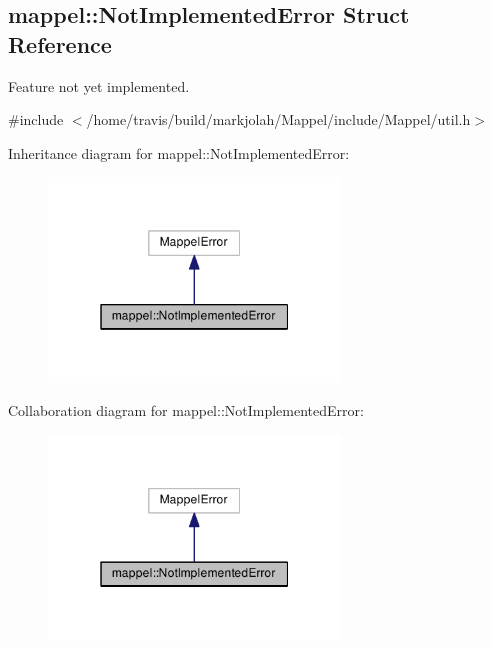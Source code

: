 \hypertarget{structmappel_1_1NotImplementedError}{}\subsection{mappel\+:\+:Not\+Implemented\+Error Struct Reference}
\label{structmappel_1_1NotImplementedError}


Feature not yet implemented.  




{\ttfamily \#include $<$/home/travis/build/markjolah/\+Mappel/include/\+Mappel/util.\+h$>$}



Inheritance diagram for mappel\+:\+:Not\+Implemented\+Error\+:\nopagebreak
\begin{figure}[H]
\begin{center}
\leavevmode
\includegraphics[width=220pt]{structmappel_1_1NotImplementedError__inherit__graph}
\end{center}
\end{figure}


Collaboration diagram for mappel\+:\+:Not\+Implemented\+Error\+:\nopagebreak
\begin{figure}[H]
\begin{center}
\leavevmode
\includegraphics[width=220pt]{structmappel_1_1NotImplementedError__coll__graph}
\end{center}
\end{figure}
